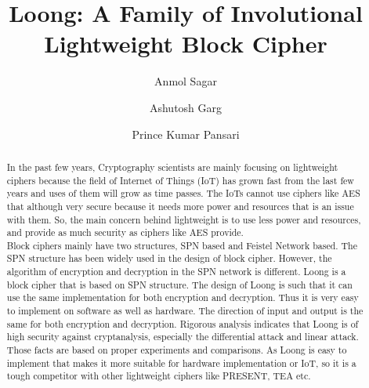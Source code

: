 \documentclass[preprint]{transcrypto}
\author{Anmol Sagar\inst{1}\and Ashutosh Garg\inst{2}\and Prince Kumar Pansari\inst{3}}
\institute{
  IIT Bhilai, Raipur, India, \email{anmols@iitbhilai.ac.in}
  \and
  IIT Bhilai, Raipur, India, \email{ashutoshg@iitbhilai.ac.in}
  \and
  IIT Bhilai, Raipur, India, \email{princep@iitbhilai.ac.in}
}
\title{Loong: A Family of Involutional Lightweight Block Cipher}
\begin{document}
\maketitle




\begin{abstract}
  
In the past few years, Cryptography scientists are mainly focusing on lightweight ciphers because the field of Internet of Things (IoT) has grown fast from the last few years and uses of them will grow as time passes. The IoTs cannot use ciphers like AES that although very secure because it needs more power and resources that is an issue with them. So, the main concern behind lightweight is to use less power and resources, and provide as much security as ciphers like AES provide.\\
Block ciphers mainly have two structures, SPN based and Feistel Network based. The SPN structure has been widely used in the design of block cipher. However, the algorithm of encryption and decryption in the SPN network is different. Loong is a block cipher that is based on SPN structure. The design of Loong is such that it can use the same implementation for both encryption and decryption. Thus it is very easy to implement on software as well as hardware. The direction of input and output is the same for both encryption and decryption.
Rigorous analysis indicates that Loong is of high security against cryptanalysis, especially the differential attack and linear attack. Those facts are based on proper experiments and comparisons. As Loong is easy to implement that makes it more suitable for hardware implementation or IoT, so it is a tough competitor with other lightweight ciphers like PRESENT, TEA etc. 
\end{abstract}


\end{document}
